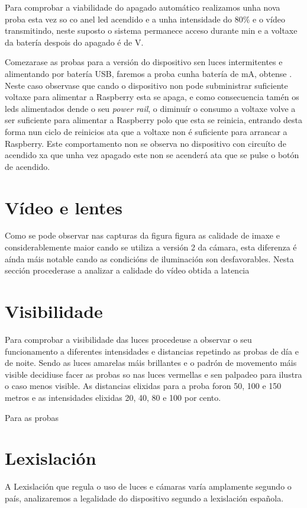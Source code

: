 Para comprobar a viabilidade do apagado automático realizamos unha nova proba esta vez so co anel led acendido e a unha intensidade do 80\(\%\) e o vídeo transmitindo, neste suposto o sistema permanece acceso durante  min e a voltaxe da batería despois do apagado é de V.

Comezarase as probas para a versión do dispositivo sen luces intermitentes e alimentando por batería USB, faremos a proba cunha batería de  mA, obtense    . Neste caso observase que cando o dispositivo non pode subministrar suficiente voltaxe para alimentar a Raspberry esta se apaga, e como consecuencia tamén os leds alimentados dende o seu \emph{power rail}, o diminuír o consumo a voltaxe volve a ser suficiente para alimentar a Raspberry polo que esta se reinicia, entrando desta forma nun ciclo de reinicios ata que a voltaxe non é suficiente para arrancar a Raspberry. Este comportamento non se observa no dispositivo con circuíto de acendido xa que unha vez  apagado este non se acenderá ata que se pulse o botón de acendido.

\section{Vídeo e lentes}
Como se pode observar nas capturas da figura figura as calidade de imaxe e considerablemente maior cando se utiliza a versión 2 da cámara, esta diferenza é aínda máis notable cando as condicións de iluminación son desfavorables.
Nesta sección procederase a analizar a calidade do vídeo obtida a latencia
\section{Visibilidade}
Para comprobar a visibilidade das luces procedeuse a observar o seu funcionamento a diferentes intensidades e distancias repetindo as probas de día e de noite. Sendo as luces amarelas máis brillantes e o padrón de movemento máis visible decidiuse facer as probas so nas luces vermellas e sen palpadeo para ilustra o caso menos visible.
As distancias elixidas para a proba foron 50, 100 e 150 metros e as intensidades elixidas 20, 40, 80 e 100 por cento.

Para as probas


\section{Lexislación}
A Lexislación que regula o uso de luces e cámaras varía amplamente segundo o país, analizaremos a legalidade do dispositivo segundo a lexislación española.
